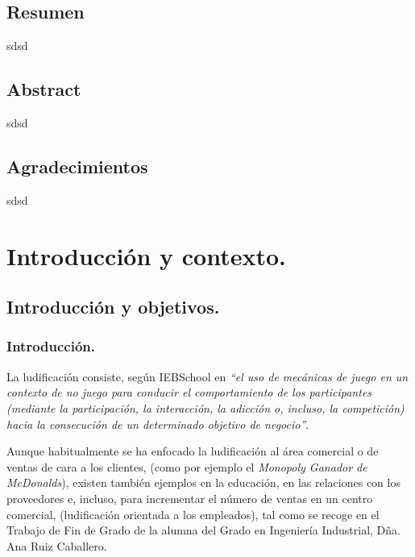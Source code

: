 \documentclass[twoside]{report}
\begin{document}
\newpage
\thispagestyle{empty}
\mbox{}

\clearpage


\section*{Resumen}
sdsd

\section*{Abstract}
sdsd

\clearpage

\section*{Agradecimientos}
sdsd

\newpage
\thispagestyle{empty}
\mbox{}

\clearpage

\tableofcontents

\listoffigures
 
\listoftables

\clearpage



\chapter{Introducción y contexto.}
\section{Introducción y objetivos.}

\subsection{Introducción.}

La ludificación consiste, según IEBSchool \cite{iebschoolGami} en \textit{“el uso de mecánicas de juego en un contexto de no juego para conducir el comportamiento de los participantes (mediante la participación, la interacción, la adicción o, incluso, la competición) hacia la consecución de un determinado objetivo de negocio”}. 

Aunque habitualmente se ha enfocado la ludificación al área comercial o de ventas de cara a los clientes, (como por ejemplo el \cite{monopolymcdo} \textit{Monopoly Ganador de McDonalds}), existen también ejemplos en la educación, en las relaciones con los proveedores e, incluso, para incrementar el número de ventas en un centro comercial, (ludificación orientada a los empleados), tal como se recoge en el Trabajo de Fin de Grado de la alumna del Grado en Ingeniería Industrial, \cite{anatfg} Dña. Ana Ruiz Caballero.
\end{document}
